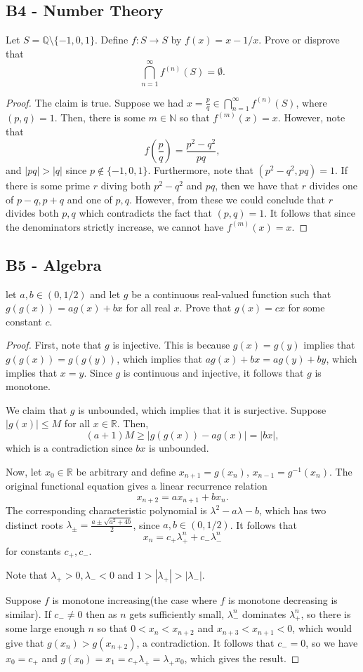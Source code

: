 \documentclass[11pt]{scrartcl}
\newcommand{\N}{\mathbb{N}}
\newcommand{\Q}{\mathbb{Q}}
\newcommand{\R}{\mathbb{R}}
\newcommand{\<}{\langle}
\renewcommand{\>}{\rangle}
\begin{document}
\subsection{B4 - Number Theory}
 Let $S = \Q \setminus\{-1, 0, 1\}$.  Define $f: S \to S$ by $f(x) = x - 1/x$.  Prove or disprove that 
$$\bigcap_{n=1}^\infty f^{(n)}(S) = \emptyset.$$
\begin{proof}
The claim is true.  Suppose we had $x = \frac{p}{q} \in \bigcap_{n=1}^\infty f^{(n)}(S)$, where $(p, q) = 1$.  Then, there is some $m \in \N$ so that $f^{(m)}(x) = x$.  However, note that 
$$f\left(\frac{p}{q} \right) = \frac{p^2 - q^2}{pq},$$
and $|pq| > |q|$ since $p \not \in \{-1, 0, 1\}$.  Furthermore, note that $(p^2 - q^2, pq) = 1$.  If there is some prime $r$ diving both $p^2 - q^2$ and $pq$, then we have that $r$ divides one of $p-q, p+q$ and one of $p, q$.  However, from these we could conclude that $r$ divides both $p, q$ which contradicts the fact that $(p, q) = 1$.  It follows that since the denominators strictly increase, we cannot have $f^{(m)}(x) = x$.
\end{proof}
\subsection{B5 - Algebra}
let $a, b \in (0, 1/2)$ and let $g$ be a continuous real-valued function such that $g(g(x)) = ag(x) + bx$ for all real $x$.  Prove that $g(x) = cx$ for some constant $c$.
\begin{proof}
First, note that $g$ is injective.  This is because $g(x) = g(y)$ implies that $g(g(x)) = g(g(y))$, which implies that $ag(x) + bx = ag(y) + by$, which implies that $x = y$.   Since $g$ is continuous and injective, it follows that $g$ is monotone. 

We claim that $g$ is unbounded, which implies that it is surjective.  Suppose $|g(x)| \le M$ for all $x \in \R$.  Then, 
$$(a+1)M \ge |g(g(x)) - ag(x)| = |bx|,$$
which is a contradiction since $bx$ is unbounded.  

Now, let $x_0 \in \R$ be arbitrary and define $x_{n+1} = g(x_n)$, $x_{n-1} = g^{-1}(x_n)$.  The original functional equation gives a linear recurrence relation
$$x_{n+2} = ax_{n+1} + bx_n.$$
The corresponding characteristic polynomial is $\lambda^2 - a\lambda - b$, which has two distinct roots $\lambda_{\pm} = \frac{a \pm \sqrt{a^2 + 4b}}{2}$, since $a, b \in (0, 1/2)$.   It follows that 
$$x_n = c_+ \lambda_+^n + c_- \lambda_-^n$$
for constants $c_+, c_-$.

Note that $\lambda_+ > 0, \lambda_- < 0$ and $1 > |\lambda_+| > |\lambda_-|$.  

Suppose $f$ is monotone increasing(the case where $f$ is monotone decreasing is similar).  If $c_- \ne 0$ then as $n$ gets sufficiently small, $\lambda_-^n$ dominates $\lambda_+^n$, so there is some large enough $n$ so that $0 < x_n < x_{n+2}$ and $x_{n+3} < x_{n+1} < 0$, which would give that $g(x_n) > g(x_{n+2})$, a contradiction.  It follows that $c_- = 0$, so we have $x_0 = c_+$ and $g(x_0) = x_1 =  c_+ \lambda_+ = \lambda_+ x_0$, which gives the result.  
\end{proof}
\end{document}
